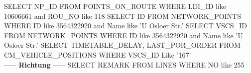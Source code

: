 \documentclass[a4paper, 12.5pt]{scrartcl}
\begin{document}
\begin{small}
\newline 
\newline SELECT NP\_ID
\newline FROM POINTS\_ON\_ROUTE
\newline WHERE LDI\_ID like 10606661 and ROU\_NO like 118
\newline 
\newline SELECT ID
\newline FROM NETWORK\_POINTS
\newline WHERE ID like 3564322920 and Name like 'U Osloer Str.' 
\newline 
\newline SELECT VSCS\_ID
\newline FROM NETWORK\_POINTS
\newline WHERE ID like 3564322920 and Name like 'U Osloer Str.'
\newline 
\newline SELECT TIMETABLE\_DELAY, LAST\_POR\_ORDER
\newline FROM CM\_VEHICLE\_POSITIONS
\newline WHERE VSCS\_ID Like '167'
\newline 
\\ \textbf{----- Richtung -----}
\newline 
\newline SELECT REMARK
\newline FROM LINES
\newline WHERE NO like 255
\end{small}
\end{document}
